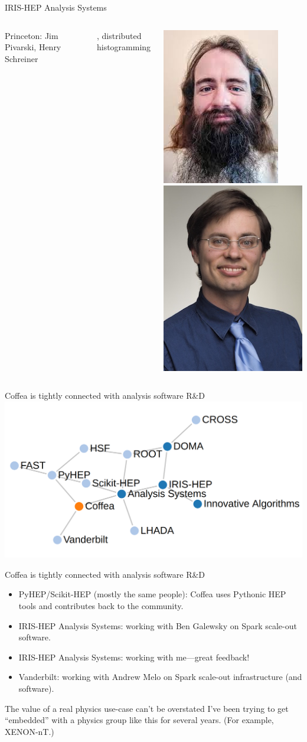 \documentclass[aspectratio=169]{beamer}
\begin{document}
\begin{frame}{IRIS-HEP Analysis Systems}
\begin{columns}[t]
\vspace{0.5 cm}
{\large Princeton: Jim Pivarski, Henry Schreiner}

, distributed histogramming

\vspace{0.2 cm}
\includegraphics[height=1.5 cm]{Jim-Pivarski.jpg}
\includegraphics[height=1.5 cm]{Henry-Schreiner.jpg}

\end{columns}
\end{frame}

\begin{frame}{Coffea is tightly connected with analysis software R\&D}
\vspace{0.5 cm}
\includegraphics[width=\linewidth]{analysis-connections.png}
\end{frame}

\begin{frame}{Coffea is tightly connected with analysis software R\&D}
\large
\vspace{0.5 cm}
\begin{itemize}\setlength{\itemsep}{0.5 cm}
\item PyHEP/Scikit-HEP (mostly the same people): Coffea uses Pythonic HEP tools and contributes back to the community.
\item IRIS-HEP Analysis Systems: working with Ben Galewsky on Spark scale-out software.
\item IRIS-HEP Analysis Systems: working with me---great feedback!
\item Vanderbilt: working with Andrew Melo on Spark scale-out infrastructure (and software).
\end{itemize}
\end{frame}

\begin{frame}{The value of a real physics use-case can't be overstated}
\Large
\vspace{0.25 cm}
I've been trying to get ``embedded'' with a physics group like this for several years. (For example, XENON-nT.)

\vspace{0.25 cm}



\end{frame}
\end{document}

